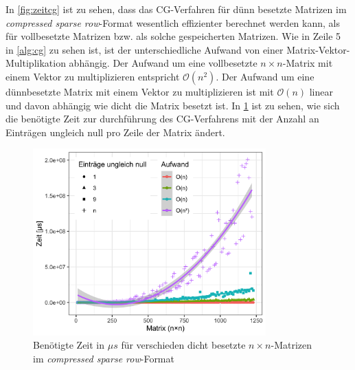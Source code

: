 \documentclass[12pt,a4paper]{scrartcl}
\numberwithin{equation}{section}
\numberwithin{myalgctr}{section}
\numberwithin{mytheoremctr}{subsection}
\numberwithin{mykorollarctr}{subsection}
\numberwithin{mylemmactr}{subsection}
\numberwithin{mybeispielctr}{subsection}
\begin{document}
	In \cref{fig:zeitcg} ist zu sehen, dass das CG-Verfahren f\"ur d\"unn besetzte Matrizen im \textit{compressed sparse row}-Format wesentlich effizienter berechnet werden kann, als f\"ur vollbesetzte Matrizen bzw. als solche gespeicherten Matrizen.
	Wie in Zeile 5 in \cref{alg:cg} zu sehen ist, ist der unterschiedliche Aufwand von einer Matrix-Vektor-Multiplikation abh\"angig. Der Aufwand um eine vollbesetzte $n\times n$-Matrix mit einem Vektor zu multiplizieren entspricht $\mathcal{O}(n^2)$. Der Aufwand um eine d\"unnbesetzte Matrix mit einem Vektor zu multiplizieren ist mit $\mathcal{O}(n)$ linear und davon abh\"angig wie dicht die Matrix besetzt ist. In \cref{fig:zeitcg-sparse} ist zu sehen, wie sich die ben\"otigte Zeit zur durchf\"uhrung des CG-Verfahrens mit der Anzahl an Eintr\"agen ungleich null pro Zeile der Matrix \"andert.
	
	\begin{figure}[H]
		\begin{center}
			\includegraphics[width=0.8\textwidth]{../plots/cg-sparsity-sparse.png}
		\end{center}
		\caption{Ben\"otigte Zeit in $\mu s$ f\"ur verschieden dicht besetzte $n\times n$-Matrizen im \textit{compressed sparse row}-Format}
		\label{fig:zeitcg-sparse}	
	\end{figure}
	
\end{document}
